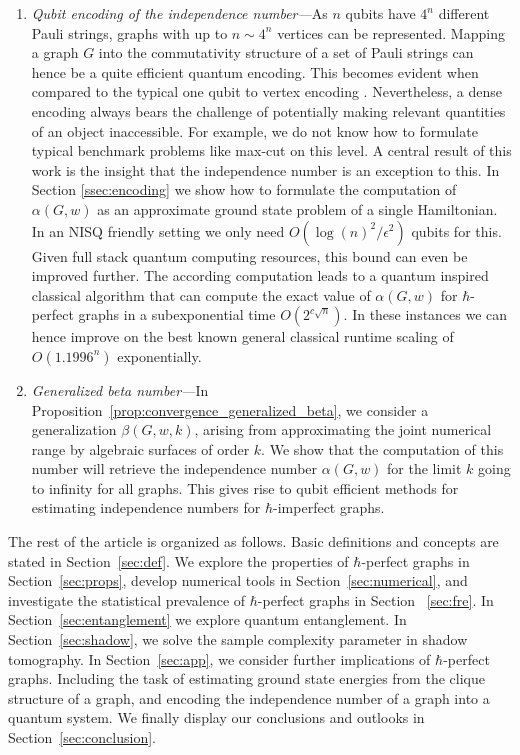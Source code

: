 \documentclass[
12pt,
prx,
aps,
reprint,
a4paper,
longbibliograph,
nofootinbib,
nobibnotes,
superscriptaddress
]{revtex4-2}
\theoremstyle{definition}
\begin{document}
\begin{enumerate}
    \item \emph{Qubit encoding of the independence number---}As $n$ qubits have $4^n$ different Pauli strings, graphs with up to $n \sim 4^n$ vertices can be represented.
    Mapping a graph $G$ into the commutativity structure of a set of Pauli strings can  hence be a quite efficient quantum encoding. This  becomes  evident when compared to the typical one qubit to vertex encoding \cite{Farhi2014AQA}. 
    Nevertheless, a dense encoding always bears the challenge of potentially making relevant quantities of an object inaccessible. For example, we do not know how to formulate typical benchmark problems like max-cut on this level.
    A central result of this work is the insight that the independence number is an exception to this. In Section \ref{ssec:encoding} we show how to formulate the computation of $\alpha(G,w)$ as an approximate ground state problem of a single Hamiltonian. In an NISQ friendly setting we only need $O(\log(n)^2/ \epsilon^2) $ qubits for this. Given full stack quantum computing resources, this bound can even be improved further. The according computation leads to a quantum inspired classical algorithm that can compute the exact value of $\alpha(G,w)$ for $\hbar$-perfect graphs in a subexponential time $O(2^{c \sqrt{n}})$. In these instances we can hence improve on the best known general classical runtime scaling of $O(1.1996^n)$ exponentially. 
   
    
    \item \emph{Generalized beta number---}In Proposition~\ref{prop:convergence_generalized_beta}, we consider a generalization $\beta(G,w,k)$, arising from approximating the joint numerical range by algebraic surfaces of order $k$. We show that the computation of this number will retrieve the independence number $\alpha(G,w)$ for the limit $k$ going to infinity for all graphs. This gives rise to qubit efficient methods for estimating independence numbers for $\hbar$-imperfect graphs. 
\end{enumerate}


The rest of the article is organized as follows. Basic definitions and concepts are stated in Section~\ref{sec:def}. We explore the properties of $\hbar$-perfect graphs in Section~\ref{sec:props}, develop numerical tools in Section~\ref{sec:numerical}, and investigate the statistical prevalence of $\hbar$-perfect graphs in Section ~\ref{sec:fre}. In Section~\ref{sec:entanglement} we explore quantum entanglement. In Section~\ref{sec:shadow}, we solve the sample complexity parameter in shadow tomography. In Section~\ref{sec:app}, we consider further implications of $\hbar$-perfect graphs. Including the task of estimating ground state energies from the clique structure of a graph, and encoding the independence number of a graph into a quantum system.  
We finally display our conclusions and outlooks in Section~\ref{sec:conclusion}.
\end{document}
